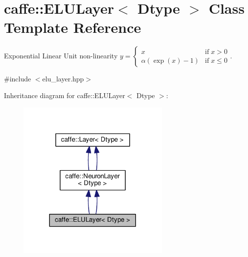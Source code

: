 \hypertarget{classcaffe_1_1_e_l_u_layer}{}\section{caffe\+:\+:E\+L\+U\+Layer$<$ Dtype $>$ Class Template Reference}
\label{classcaffe_1_1_e_l_u_layer}


Exponential Linear Unit non-\/linearity $ y = \left\{ \begin{array}{lr} x & \mathrm{if} \; x > 0 \\ \alpha (\exp(x)-1) & \mathrm{if} \; x \le 0 \end{array} \right. $. ~\newline
  




{\ttfamily \#include $<$elu\+\_\+layer.\+hpp$>$}



Inheritance diagram for caffe\+:\+:E\+L\+U\+Layer$<$ Dtype $>$\+:
\nopagebreak
\begin{figure}[H]
\begin{center}
\leavevmode
\includegraphics[width=212pt]{classcaffe_1_1_e_l_u_layer__inherit__graph}
\end{center}
\end{figure}
